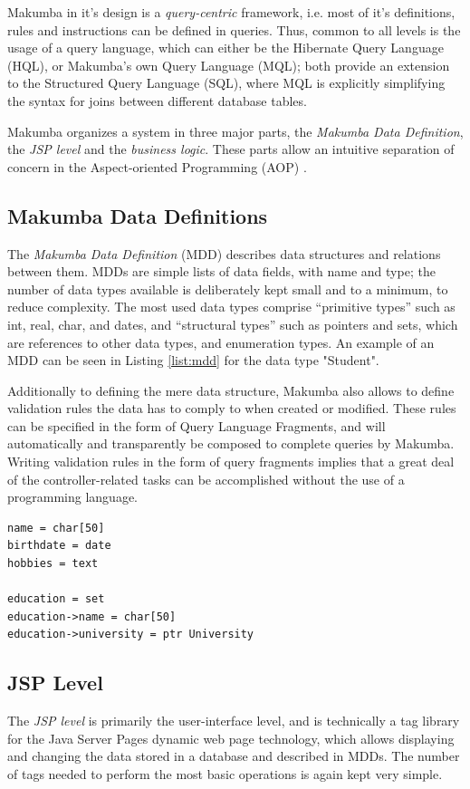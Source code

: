 \documentclass{llncs}
\begin{document}
Makumba in it's design is a \textit{query-centric} framework, i.e. most of it's definitions, rules and instructions can be defined in queries. Thus, common to all levels is the usage of a query language, which can either be the Hibernate Query Language (HQL), or Makumba's own Query Language (MQL); both provide an extension to the Structured Query Language (SQL), where MQL is explicitly simplifying the syntax for joins between different database tables.

Makumba organizes a system in three major parts, the \textit{Makumba Data Definition}, the \textit{JSP level} and the \textit{business logic}. These parts allow an intuitive separation of concern in the Aspect-oriented Programming (AOP) \cite{Kiczales97aspect-orientedprogramming}.

\subsection{Makumba Data Definitions}
The \textit{Makumba Data Definition} (MDD) describes data structures and relations between them. MDDs are simple lists of data fields, with name and type; the number of data types available is deliberately kept small and to a minimum, to reduce complexity. The most used data types comprise ``primitive types'' such as int, real, char, and dates, and ``structural types'' such as pointers and sets, which are references to other data types, and enumeration types. An example of an MDD can be seen in Listing \ref{list:mdd} for the data type "Student".

Additionally to defining the mere data structure, Makumba also allows to define validation rules the data has to comply to when created or modified. These rules can be specified in the form of Query Language Fragments, and will automatically and transparently be composed to complete queries by Makumba. Writing validation rules in the form of query fragments implies that a great deal of the controller-related tasks can be accomplished without the use of a programming language.

\lstset{basicstyle=\small, captionpos=b, caption=Makumba Data Definition "Student", label=list:mdd, frame=shadowbox}
\begin{lstlisting}[t]
name = char[50]
birthdate = date
hobbies = text

education = set
education->name = char[50]
education->university = ptr University
\end{lstlisting}

\subsection{JSP Level}
The \textit{JSP level} is primarily the user-interface level, and is technically a tag library for the Java Server Pages dynamic web page technology, which allows displaying and changing the data stored in a database and described in MDDs. The number of tags needed to perform the most basic operations is again kept very simple.
\end{document}
